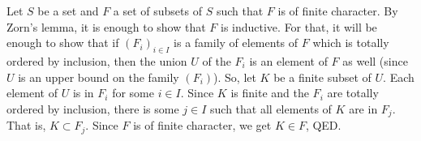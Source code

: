 \documentclass[12pt]{article}
\begin{document}
Let $S$ be a set and $F$ a set of subsets of $S$ such that $F$ is
of finite character. By Zorn's lemma, it is enough to show that
$F$ is inductive. For that, it will be enough to show that if
$(F_i)_{i\in I}$ is a family of elements of $F$ which is totally ordered
by inclusion, then the union $U$ of the $F_i$ is an element of $F$
as well (since $U$ is an upper bound on the family $(F_i)$).
So, let $K$ be a finite subset of $U$. Each element of
$U$ is in $F_i$ for some $i\in I$. Since $K$ is finite and
the $F_i$ are totally ordered by inclusion, there is some $j\in I$
such that all elements of $K$ are in $F_j$. That is, $K\subset F_j$.
Since $F$ is of finite character, we get $K\in F$, QED.
\end{document}
